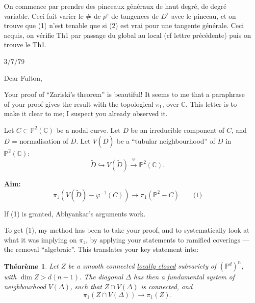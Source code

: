 \documentclass[11pt,a4paper]{article}
\theoremstyle{plain}
\newtheorem{theorem}{Th\'eor\`eme}
\theoremstyle{definition}
\begin{document}
\medskip

On commence par prendre des pinceaux g\'en\'eraux de haut degr\'e, de degr\'e variable. Ceci fait varier le $\#$ de $p^e$ de tangences de $D^\circ$ avec le pinceau, et on trouve que (1) n'est tenable que si (2) est vrai pour une tangente g\'en\'erale. Ceci acquis, on v\'erifie Th1 par passage du global au local (cf lettre pr\'ec\'edente) puis on trouve le Th1.

\newpage

\begin{flushright}
3/7/79
\end{flushright}

\noindent Dear Fulton,

\medskip

Your proof of ``Zariski's theorem'' is beautiful! It seems to me that a paraphrase of your proof gives the result with the topological $\pi_1$, over $\mathbb{C}$. This letter is to make it clear to me; I suspect you already observed it.

Let $C \subset \mathbb{P}^2(\mathbb{C})$ be a nodal curve. Let $D$ be an irreducible component of $C$, and $\widetilde{D}$ = normalisation of $D$. Let $V(\widetilde{D})$ be a ``tubular neighbourhood'' of $\widetilde{D}$ in $\mathbb{P}^2(\mathbb{C})$:
\[
\widetilde{D} \hookrightarrow V(\widetilde{D}) \xrightarrow{\varphi} \mathbb{P}^2(\mathbb{C}).
\]

\medskip

\noindent \textbf{Aim:}
\[
\pi_1(V(\widetilde{D}) - \varphi^{-1}(C)) \longrightarrow \pi_1(\mathbb{P}^2 - C) \qquad \text{(1)}
\]

If (1) is granted, Abhyankar's arguments work.

To get (1), my method has been to take your proof, and to systematically look at what it was implying on $\pi_1$, by applying your statements to ramified coverings --- the removal ``algebraic''. This translates your key statement into:

\begin{theorem}
Let $Z$ be a smooth connected \underline{locally closed} subvariety of $(\mathbb{P}^d)^n$, with $\dim Z > d(n-1)$. The diagonal $\Delta$ has then a fundamental system of neighbourhood $V(\Delta)$, such that $Z \cap V(\Delta)$ is connected, and
\[
\pi_1(Z \cap V(\Delta)) \longrightarrow \pi_1(Z).
\]
\end{theorem}
\end{document}
